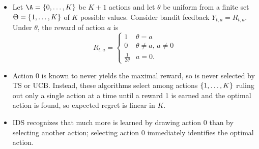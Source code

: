 \documentclass[11pt, openany]{book}
\begin{document}
\begin{example}
    \vspace*{-20pt}
    \begin{itemize}
        \item Let $\A=\set{0,\dots,K}$ be $K+1$ actions and let $\theta$ be uniform from a finite set $\Theta=\left\lbrace1,\dots,K\right\rbrace$ of $K$ possible values. Consider bandit feedback $Y_{t,a}=R_{t,a}$. Under $\theta$, the reward of action $a$ is
            \[
                R_{t,a} = \begin{cases}
                    1 & \theta = a \\
                    0 & \theta\neq a, \, a\neq 0 \\
                    \frac{1}{2\theta} & a = 0.
                \end{cases}
            \]
        \item Action $0$ is known to never yields the maximal reward, so is never selected by TS or UCB. Instead, these algorithms select among actions $\left\lbrace1,\dots,K\right\rbrace$ ruling out only a single action at a time until a reward 1 is earned and the optimal action is found, so expected regret is linear in $K$.
        \item IDS recognizes that much more is learned by drawing action $0$ than by selecting another action; selecting action $0$ immediately identifies the optimal action.
    \end{itemize}
\end{example}
\end{document}
